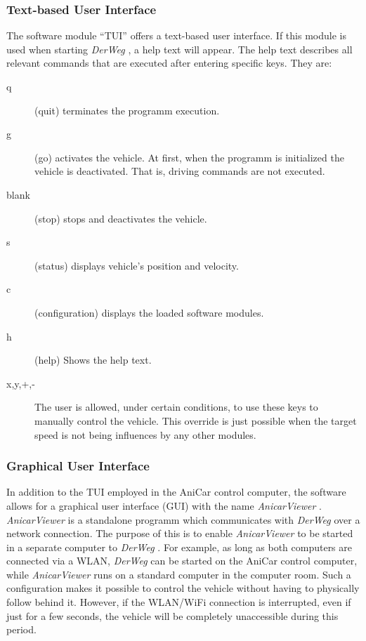 \documentclass[a4paper, 11pt]{article}
\newcommand{\DerWeg}{\textit{DerWeg }} %
\newcommand{\AnicarViewer}{\textit{AnicarViewer }} %
\begin{document}
\subsubsection{Text-based User Interface}
\label{sec:tui}

The software module "`TUI"' offers a text-based user interface. If this module is used when starting \DerWeg , a help text will appear. The help text describes all relevant commands that are executed after entering specific keys.  
They are:

\begin{description}
\item[q] (quit) terminates the programm execution.
\item[g] (go) activates the vehicle. At first, when the programm is initialized the vehicle is deactivated. That is, driving commands are not executed.
\item[blank] (stop) stops and deactivates the vehicle. 
\item[s] (status) displays vehicle's position and velocity. 
\item[c] (configuration) displays the loaded software modules. 
\item[h] (help) Shows the help text. 
\item[x,y,+,-] The user is allowed, under certain conditions, to use these keys to manually control the vehicle. This override is just possible when the target speed is not being influences by any other modules. 
\end{description}

\subsubsection{Graphical User Interface}
\label{sec:gui}

In addition to the TUI employed in the AniCar control computer, the software allows for a graphical user interface (GUI) with the name \AnicarViewer. \AnicarViewer is a standalone programm which communicates with \DerWeg over a network connection. The purpose of this is to enable \AnicarViewer to be started in a separate computer to \DerWeg. For example, as long as both computers are connected via a WLAN, \DerWeg can be started on the AniCar control computer, while \AnicarViewer runs on a standard computer in the computer room. Such a configuration makes it possible to control the vehicle without having to physically follow behind it. However, if the WLAN/WiFi connection is interrupted, even if just for a few seconds, the vehicle will be completely unaccessible during this period.  
\end{document}
